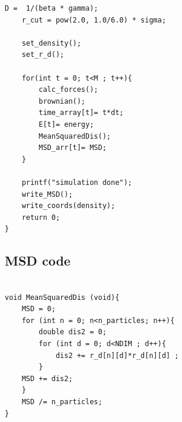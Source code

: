 \begin{lstlisting}[style=Cstyle]
    D =  1/(beta * gamma);
    r_cut = pow(2.0, 1.0/6.0) * sigma;
    
    set_density();
    set_r_d();
    
    for(int t = 0; t<M ; t++){
        calc_forces();
        brownian(); 
        time_array[t]= t*dt;
        E[t]= energy;  
        MeanSquaredDis();
        MSD_arr[t]= MSD;
    }

    printf("simulation done");
    write_MSD();
    write_coords(density);
    return 0;
}

\end{lstlisting}

\subsection{MSD code}\label{app: MSD}
\begin{lstlisting}[style=Cstyle]

void MeanSquaredDis (void){
    MSD = 0;
    for (int n = 0; n<n_particles; n++){
        double dis2 = 0;
        for (int d = 0; d<NDIM ; d++){
            dis2 += r_d[n][d]*r_d[n][d] ;
        }
    MSD += dis2;
    }
    MSD /= n_particles;
}
\end{lstlisting}
